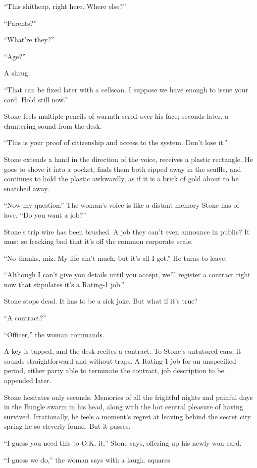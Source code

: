 “This shitheap, right here. Where else?”

“Parents?”

“What’re they?”

“Age?”

A shrug.

“That can be fixed later with a cellscan. I suppose we have enough to issue your card. Hold still now.”

Stone feels multiple pencils of warmth scroll over his face; seconds later, a chuntering sound from the desk.

“This is your proof of citizenship and access to the system. Don’t lose it.”

Stone extends a hand in the direction of the voice, receives a plastic rectangle. He goes to shove it into a pocket, finds them both ripped away in the scuffle, and continues to hold the plastic awkwardly, as if it is a brick of gold about to be snatched away.

“Now my question.” The woman’s voice is like a distant memory Stone has of love. “Do you want a job?”

Stone’s trip wire has been brushed. A job they can’t even announce in public? It must so fracking bad that it’s off the common corporate scale.

“No thanks, miz. My life ain’t much, but it’s all I got.” He turns to leave.

“Although I can’t give you details until you accept, we’ll register a contract right now that stipulates it’s a Rating-1 job.”

Stone stops dead. It has to be a sick joke. But what if it’s true?

“A contract?”

“Officer,” the woman commands.

A key is tapped, and the desk recites a contract. To Stone’s untutored ears, it sounds straightforward and without traps. A Rating-1 job for an unspecified period, either party able to terminate the contract, job description to be appended later.

Stone hesitates only seconds. Memories of all the frightful nights and painful days in the Bungle swarm in his head, along with the hot central pleasure of having survived. Irrationally, he feels a moment’s regret at leaving behind the secret city spring he so cleverly found. But it passes.

“I guess you need this to O.K. it,” Stone says, offering up his newly won card.

“I guess we do,” the woman says with a laugh.
squares

